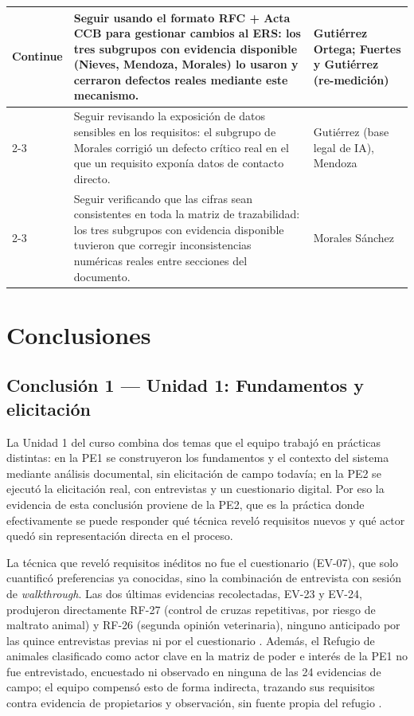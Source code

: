 \documentclass[journal,onecolumn]{IEEEtran}
\begin{document}
\begin{longtable}{|p{2.2cm}|p{7.3cm}|p{4.3cm}|}
	\multirow{3}{*}{Continue}
	& Seguir usando el formato RFC + Acta CCB para gestionar cambios al ERS: los tres subgrupos con evidencia disponible (Nieves, Mendoza, Morales) lo usaron y cerraron defectos reales mediante este mecanismo. & Gutiérrez Ortega; Fuertes y Gutiérrez (re-medición) \\
	\cline{2-3}
	& Seguir revisando la exposición de datos sensibles en los requisitos: el subgrupo de Morales corrigió un defecto crítico real en el que un requisito exponía datos de contacto directo. & Gutiérrez (base legal de IA), Mendoza \\
	\cline{2-3}
	& Seguir verificando que las cifras sean consistentes en toda la matriz de trazabilidad: los tres subgrupos con evidencia disponible tuvieron que corregir inconsistencias numéricas reales entre secciones del documento. & Morales Sánchez \\
	\hline
\end{longtable}
	
	\newpage
	
	\section{Conclusiones}
	
	\subsection*{Conclusión 1 --- Unidad 1: Fundamentos y elicitación}
	La Unidad 1 del curso combina dos temas que el equipo trabajó en prácticas
	distintas: en la PE1 se construyeron los fundamentos y el contexto del
	sistema mediante análisis documental, sin elicitación de campo todavía; en
	la PE2 se ejecutó la elicitación real, con entrevistas y un cuestionario
	digital. Por eso la evidencia de esta conclusión proviene de la PE2, que es
	la práctica donde efectivamente se puede responder qué técnica reveló
	requisitos nuevos y qué actor quedó sin representación directa en el
	proceso.
	
	La técnica que reveló requisitos inéditos no fue el cuestionario (EV-07),
	que solo cuantificó preferencias ya conocidas, sino la combinación de
	entrevista con sesión de \emph{walkthrough}. Las dos últimas evidencias
	recolectadas, EV-23 y EV-24, produjeron directamente RF-27 (control de
	cruzas repetitivas, por riesgo de maltrato animal) y RF-26 (segunda opinión
	veterinaria), ninguno anticipado por las quince entrevistas previas ni por
	el cuestionario \cite{pohl2025}. Además, el Refugio de animales
	clasificado como actor clave en la matriz de poder e interés de la PE1
	no fue entrevistado, encuestado ni observado en ninguna de las 24
	evidencias de campo; el equipo compensó esto de forma indirecta, trazando
	sus requisitos contra evidencia de propietarios y observación, sin fuente
	propia del refugio \cite{swebok2024}.
	
\end{document}
